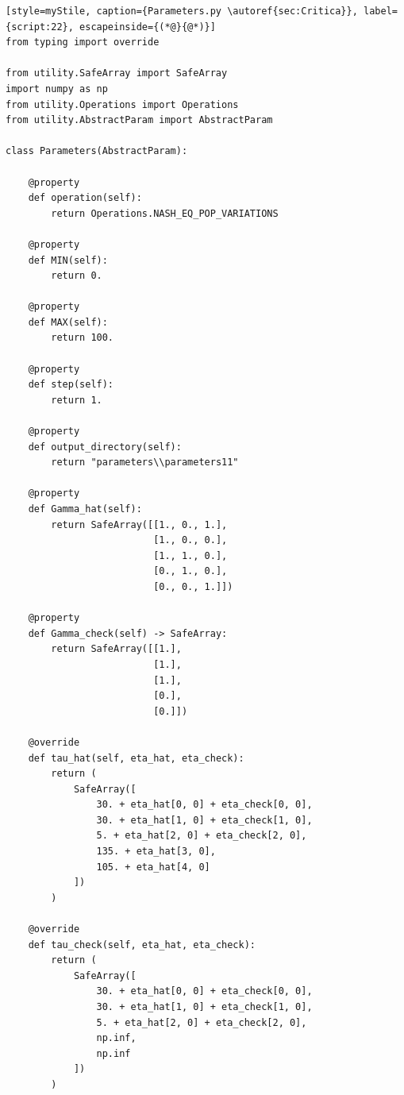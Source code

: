 \begin{lstlisting}[style=myStile, caption={Parameters.py \autoref{sec:Critica}}, label={script:22}, escapeinside={(*@}{@*)}]
from typing import override

from utility.SafeArray import SafeArray
import numpy as np
from utility.Operations import Operations
from utility.AbstractParam import AbstractParam

class Parameters(AbstractParam):

    @property
    def operation(self):
        return Operations.NASH_EQ_POP_VARIATIONS

    @property
    def MIN(self):
        return 0.

    @property
    def MAX(self):
        return 100.

    @property
    def step(self):
        return 1.
    
    @property
    def output_directory(self):
        return "parameters\\parameters11"

    @property
    def Gamma_hat(self):
        return SafeArray([[1., 0., 1.],
                          [1., 0., 0.],
                          [1., 1., 0.],
                          [0., 1., 0.],
                          [0., 0., 1.]])
    
    @property
    def Gamma_check(self) -> SafeArray:
        return SafeArray([[1.],
                          [1.],
                          [1.],
                          [0.],
                          [0.]])
    
    @override
    def tau_hat(self, eta_hat, eta_check):        
        return (
            SafeArray([
                30. + eta_hat[0, 0] + eta_check[0, 0],
                30. + eta_hat[1, 0] + eta_check[1, 0],
                5. + eta_hat[2, 0] + eta_check[2, 0],
                135. + eta_hat[3, 0],
                105. + eta_hat[4, 0]
            ])
        )
    
    @override
    def tau_check(self, eta_hat, eta_check):
        return (
            SafeArray([
                30. + eta_hat[0, 0] + eta_check[0, 0],
                30. + eta_hat[1, 0] + eta_check[1, 0],
                5. + eta_hat[2, 0] + eta_check[2, 0],
                np.inf,
                np.inf
            ])
        )
\end{lstlisting}

